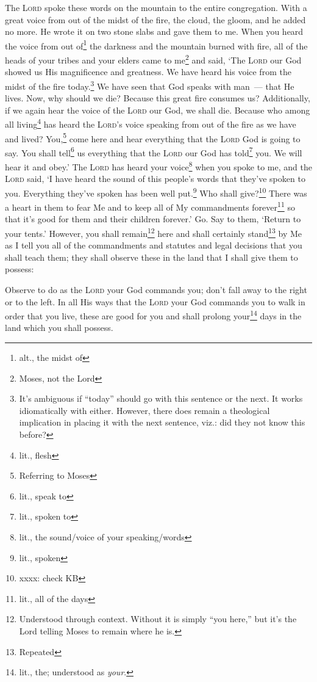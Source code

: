 \begin{inparaenum}
     The \textsc{Lord} spoke these words on the mountain to the entire congregation. With a great voice from out of the midst of the fire, the cloud, the gloom, and he added no more. He wrote it on two stone slabs and gave them to me.%
     When you heard the voice from out of\footnote{alt., the midst of} the darkness and the mountain burned with fire, all of the heads of your tribes and your elders came to me\footnote{Moses, not the Lord}%
     and said, `The \textsc{Lord} our God showed us His magnificence and greatness. We have heard his voice from the midst of the fire today.\footnote{It's ambiguous if ``today'' should go with this sentence or the next. It works idiomatically with either. However, there does remain a theological implication in placing it with the next sentence, viz.: did they not know this before?} We have seen that God speaks with man~--- that He lives.%
     Now, why should we die? Because this great fire consumes us? Additionally, if we again hear the voice of the \textsc{Lord} our God, we shall die.%
     Because who among all living\footnote{lit., flesh} has heard the \textsc{Lord}'s voice speaking from out of the fire as we have and lived?%
     You,\footnote{Referring to Moses} come here and hear everything that the \textsc{Lord} God is going to say. You shall tell\footnote{lit., speak to} us everything that the \textsc{Lord} our God has told\footnote{lit., spoken to} you. We will hear it and obey.'%
     The \textsc{Lord} has heard your voice\footnote{lit., the sound/voice of your speaking/words} when you spoke to me, and the \textsc{Lord} said, `I have heard the sound of this people's words that they've spoken to you. Everything they've spoken has been well put.\footnote{lit., spoken}%
     Who shall give?\footnote{xxxx: check KB} There was a heart in them to fear Me and to keep all of My commandments forever\footnote{lit., all of the days} so that it's good for them and their children forever.'%
     Go. Say to them, `Return to your tents.'%
     However, you shall remain\footnote{Understood through context. Without it is simply ``you here,'' but it's the Lord telling Moses to remain where he is.} here and shall certainly stand\footnote{Repeated} by Me as I tell you all of the commandments and statutes and legal decisions that you shall teach them; they shall observe these in the land that I shall give them to possess:%
\end{inparaenum}
\begin{enumerate}
    \setcounter{enumi}{31}
     Observe to do as the \textsc{Lord} your God commands you; don't fall away to the right or to the left.%
     In all His ways that the \textsc{Lord} your God commands you to walk in order that you live, these are good for you and shall prolong your\footnote{lit., the; understood as \textit{your}.} days in the land which you shall possess.%
\end{enumerate}
